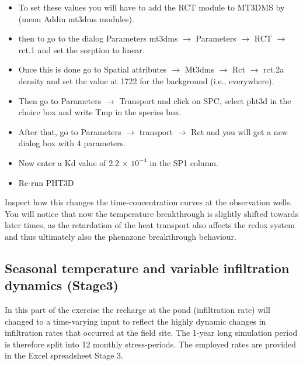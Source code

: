 \begin{itemize}
\item To set these values you will have to add the {\color{blue}RCT} module to MT3DMS by
(menu {\color{blue}Addin} {\color{blue}mt3dms modules}).

\item then to go to the dialog 
{\color{blue}Parameters} {\color{blue}mt3dms} $\rightarrow$ {\color{blue}Parameters} 
$\rightarrow$ {\color{blue}RCT} $\rightarrow$  {\color{blue}rct.1} 
and set the sorption to linear. 

\item Once this is done go to 
{\color{blue}Spatial attributes} $\rightarrow$ {\color{blue}Mt3dms} $\rightarrow$ 
{\color{blue}Rct} $\rightarrow$  {\color{blue}rct.2a density} 
and set the value at 1722 for the background (i.e., everywhere). 

\item Then go to {\color{blue}Parameters} $\rightarrow$ {\color{blue}Transport} 
and click on {\color{blue}SPC}, 
select {\color{blue}pht3d} in the choice box and write {\color{blue}Tmp} in the species box. 

\item After that, go to {\color{blue}Parameters} $\rightarrow$ {\color{blue}transport} $\rightarrow$ 
{\color{blue}Rct} and you will get a new dialog box with 4 parameters. 

\item Now enter a Kd value of 2.2 $\times$ $10^{-4}$ in the {\color{blue}SP1} column.

\item Re-run PHT3D 

\end{itemize}

Inspect how this changes the time-concentration curves at the observation wells. 
You will notice that now the temperature breakthrough is slightly shifted towards later times, 
as the retardation of the heat transport also affects the redox system and thus ultimately 
also the phenazone breakthrough behaviour.

\subsection[Seasonal temperature and variable infiltration (Stage 3)]
{Seasonal temperature and variable infiltration dynamics (Stage3)}

In this part of the exercise the recharge at the pond (infiltration rate) will changed to a time-varying input
to reflect the highly dynamic changes in infiltration rates that occurred at the field site.
The 1-year long simulation period is therefore split into 12 monthly stress-periods. 
The employed rates are provided in the Excel spreadsheet {\color{blue}Stage 3}.

